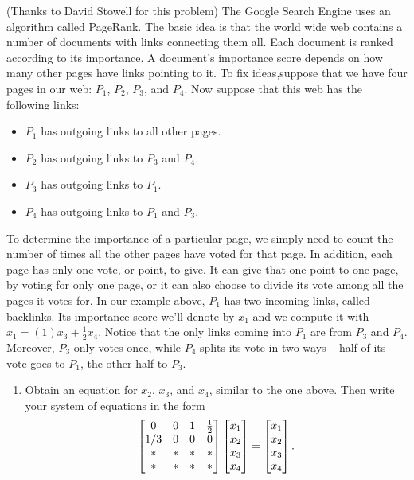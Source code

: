 \mysubsection{\ideacon}
\begin{problem}(Thanks to David Stowell for this problem) 
%
The Google Search Engine uses an algorithm called PageRank.
The basic idea is that the world wide web contains a number of documents with links connecting them all.  
Each document is ranked according to its importance.
A document's importance score depends on how many other pages have links pointing to it.
To fix ideas,suppose that we have four pages in our web: $P_1$, $P_2$, $P_3$, and $P_4$. 
Now suppose that this web has the following links:\
\begin{itemize}
 \item $P_1$ has outgoing links to all other pages.
 \item $P_2$ has outgoing links to $P_3$ and $P_4$.
 \item $P_3$ has outgoing links to $P_1$.
 \item $P_4$ has outgoing links to $P_1$ and $P_3$.
\end{itemize}
To determine the importance of a particular page, we simply need to count the number of times all the other pages have voted for that page.  In addition, each page has only one vote, or point, to give. It can give that one point to one page, by voting for only one page, or it can also choose to divide its vote among all the pages it votes for. In our example above, $P_1$ has two incoming links, called backlinks.
Its importance score we'll denote by $x_1$ and we compute it with $x_1 = (1){x_3}+\frac{1}{2}x_4$. Notice that the only links coming into $P_1$ are from $P_3$ and $P_4$. Moreover, $P_3$ only votes once, while $P_4$ splits its vote in two ways -- half of its vote goes to $P_1$, the other half to $P_3$. 
\begin{enumerate}
 \item Obtain an equation for $x_2$, $x_3$, and $x_4$, similar to the one above.  Then write your system of equations in the form 
$$
\begin{bmatrix} 
0&0&1&\frac{1}{2}\\
1/3&0&0&0\\
*&*&*&*\\
*&*&*&*
 \end{bmatrix}
\begin{bmatrix} x_1\\x_2\\x_3\\x_4 \end{bmatrix}=\begin{bmatrix} x_1\\x_2\\x_3\\x_4 \end{bmatrix}.
$$
\end{enumerate}
\end{problem}
